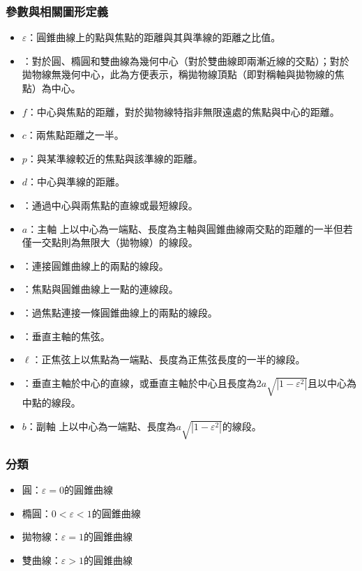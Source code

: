 \documentclass[a4paper,12pt]{report}
\begin{document}
\subsubsection{參數與相關圖形定義}
\begin{itemize}
\item {}$\varepsilon$：圓錐曲線上的點與焦點的距離與其與準線的距離之比值。
\item {}：對於圓、橢圓和雙曲線為幾何中心（對於雙曲線即兩漸近線的交點）；對於拋物線無幾何中心，此為方便表示，稱拋物線頂點（即對稱軸與拋物線的焦點）為中心。
\item {}$f$：中心與焦點的距離，對於拋物線特指非無限遠處的焦點與中心的距離。
\item {}$c$：兩焦點距離之一半。
\item {}$p$：與某準線較近的焦點與該準線的距離。
\item {}$d$：中心與準線的距離。
\item {}：通過中心與兩焦點的直線或最短線段。
\item {}$a$：主軸
上以中心為一端點、長度為主軸與圓錐曲線兩交點的距離的一半但若僅一交點則為無限大（拋物線）的線段。
\item {}：連接圓錐曲線上的兩點的線段。
\item {}：焦點與圓錐曲線上一點的連線段。
\item {}：過焦點連接一條圓錐曲線上的兩點的線段。
\item {}：垂直主軸的焦弦。
\item {}$\ell$：正焦弦上以焦點為一端點、長度為正焦弦長度的一半的線段。
\item {}：垂直主軸於中心的直線，或垂直主軸於中心且長度為$2a\sqrt{|1-\varepsilon^2|}$且以中心為中點的線段。
\item {}$b$：副軸
上以中心為一端點、長度為$a\sqrt{|1-\varepsilon^2|}$的線段。
\end{itemize}
\subsubsection{分類}
\begin{itemize}
\item 圓：$\varepsilon=0$的圓錐曲線
\item 橢圓：$0<\varepsilon<1$的圓錐曲線
\item 拋物線：$\varepsilon=1$的圓錐曲線
\item 雙曲線：$\varepsilon>1$的圓錐曲線
\end{itemize}
\end{document}
